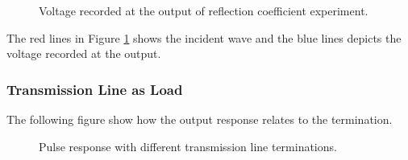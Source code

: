 \documentclass[report.tex]{subfiles}
\begin{document}
\begin{figure}[H]
    \centering
    
	\caption{Voltage recorded at the output of reflection coefficient experiment.}
	\label{fig:Lab 1 Voltage recorded at the output.}
\end{figure}

The red lines in Figure \ref{fig:Lab 1 Voltage recorded at the output.} shows the incident wave and the blue lines depicts the voltage recorded at the output.

\subsubsection{Transmission Line as Load}
The following figure show how the output response relates to the termination.

\begin{figure}[H]
	\centering
	\caption{Pulse response with different transmission line terminations.}
	\label{fig:Lab 1 Pulse responses.}
\end{figure}
\end{document}
